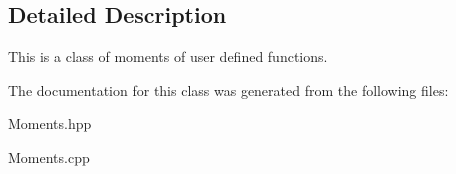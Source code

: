 \subsection{Detailed Description}
This is a class of moments of user defined functions. 

The documentation for this class was generated from the following files\+:\begin{DoxyCompactItemize}
\item 
Moments.\+hpp\item 
Moments.\+cpp\end{DoxyCompactItemize}
